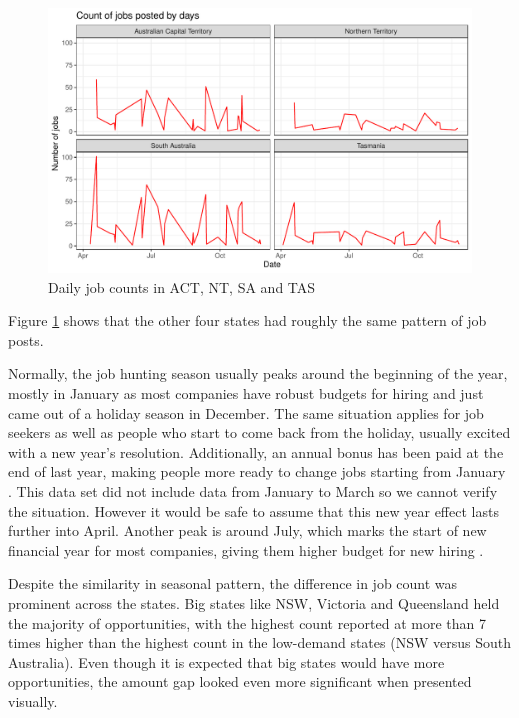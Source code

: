 \documentclass[11pt,a4paper,]{article}
\begin{document}
\begin{figure}
\centering
\includegraphics{Team_JHDP_Assignment4_files/figure-latex/low-demand-state-1.pdf}
\caption{\label{fig:low-demand-state}Daily job counts in ACT, NT, SA and TAS}
\end{figure}

Figure \ref{fig:low-demand-state} shows that the other four states had roughly the same pattern of job posts.

Normally, the job hunting season usually peaks around the beginning of the year, mostly in January as most companies have robust budgets for hiring and just came out of a holiday season in December. The same situation applies for job seekers as well as people who start to come back from the holiday, usually excited with a new year's resolution. Additionally, an annual bonus has been paid at the end of last year, making people more ready to change jobs starting from January \autocite{emswiler_2016}. This data set did not include data from January to March so we cannot verify the situation. However it would be safe to assume that this new year effect lasts further into April. Another peak is around July, which marks the start of new financial year for most companies, giving them higher budget for new hiring \autocite{emswiler_2016}.

Despite the similarity in seasonal pattern, the difference in job count was prominent across the states. Big states like NSW, Victoria and Queensland held the majority of opportunities, with the highest count reported at more than 7 times higher than the highest count in the low-demand states (NSW versus South Australia). Even though it is expected that big states would have more opportunities, the amount gap looked even more significant when presented visually.
\end{document}
